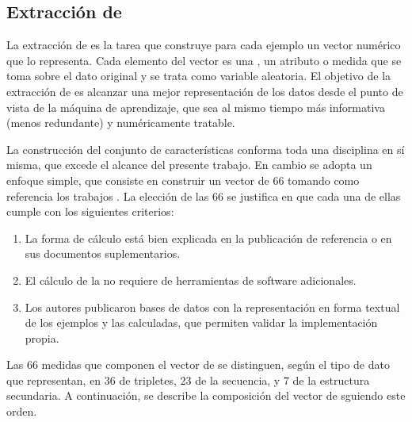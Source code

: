 %
%
\subsection{Extracción de }
%
La extracción de  es la tarea que construye para cada
ejemplo un vector numérico que lo representa.
Cada elemento del vector es una \e{\caract{}}, un atributo o medida
que se toma sobre el dato original y se trata como variable aleatoria.
El objetivo de la extracción de  es alcanzar una mejor
representación de los datos desde el punto de vista de la máquina de
aprendizaje, que sea al mismo tiempo más informativa (menos
redundante) y numéricamente tratable.

La construcción del conjunto de características conforma toda una
disciplina en sí misma, que excede el alcance del presente trabajo.
En cambio se adopta un enfoque simple, que consiste en construir un
vector de 66  tomando como referencia los trabajos
\cite{xue,ng,batuwita}.
La elección de las 66  se justifica en que cada una de ellas
cumple con los siguientes criterios:
%
\begin{enumerate}
\item
  La forma de cálculo está bien explicada en la publicación de
  referencia o en sus documentos suplementarios.
\item
  El cálculo de la \caract{} no requiere de herramientas de software
  adicionales.
\item
  Los autores publicaron bases de datos con la representación en forma
  textual de los ejemplos y las  calculadas, que permiten
  validar la implementación propia.
\end{enumerate}
%
Las 66 medidas que componen el vector de  se distinguen,
según el tipo de dato que representan, en 36  de tripletes,
23  de la secuencia, y 7 de la estructura secundaria.
A continuación, se describe la composición del vector de 
sguiendo este orden.
